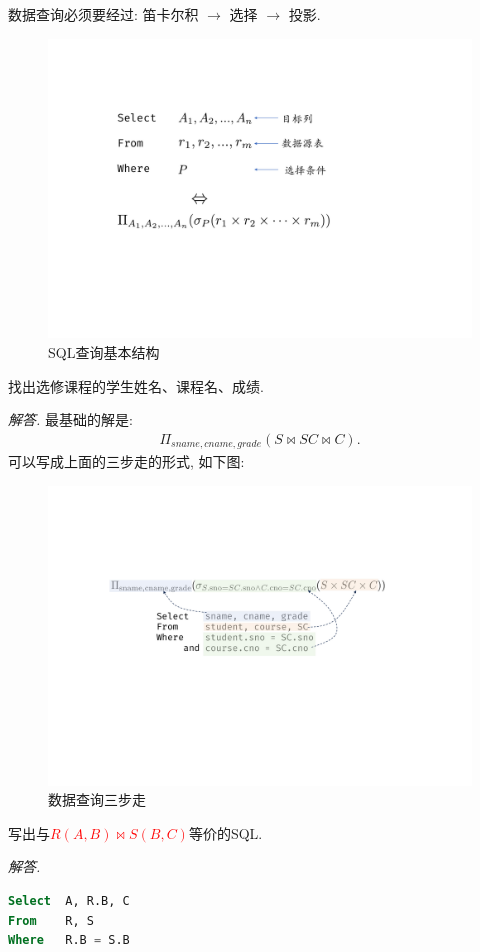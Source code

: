 数据查询必须要经过: 笛卡尔积 $\to$ 选择 $\to$ 投影.

\begin{figure}[H]
    \centering
    \includegraphics[width=.5\textwidth]{figure/数据查询.pdf}
    \caption{SQL查询基本结构}
\end{figure}

\begin{example}
  找出选修课程的学生姓名、课程名、成绩.
\end{example}

\textit{ 解答. }最基础的解是:
\begin{align*}
    \Pi_{sname,cname,grade} (S \bowtie SC \bowtie C).
\end{align*}
可以写成上面的三步走的形式, 如下图:
\begin{figure}[H]
    \centering
    \includegraphics[width=.7\textwidth]{figure/查询例题1.pdf}
    \caption{数据查询三步走}
\end{figure}

\begin{example}
  写出与\textcolor{red}{$R(A,B) \bowtie S(B,C)$}等价的SQL.
\end{example}

\textit{ 解答. }
\begin{lstlisting}[language=SQL]
Select  A, R.B, C
From    R, S
Where   R.B = S.B
\end{lstlisting}

